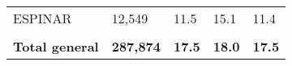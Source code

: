 \begin{tabular}{lllll}
	\cellcolor[HTML]{FF5050}ESPINAR                                & 12,549                                                                & 11.5                                                                             & 15.1                                                                        & 11.4                                                                                \\
	&                                                                       &                                                                                  &                                                                             &                                                                                     \\
	\rowcolor[HTML]{DDEBF7} 
	\textbf{Total   general}                                       & \textbf{287,874}                                                      & \textbf{17.5}                                                                    & \textbf{18.0}                                                               & \textbf{17.5}                                                                      
\end{tabular}